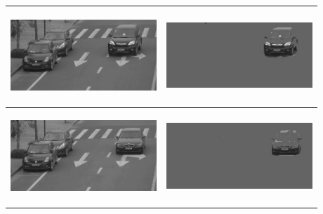 \documentclass[a4paper]{article}
\begin{document}
\begin{itemize}[label={}]
\begin{table}[h!]
\begin{tabular}{|>{\centering\arraybackslash}m{6cm}|>{\centering\arraybackslash}m{6cm}|}
        \includegraphics[width=5.5cm,height=3.5cm]{images/result/frame/frame300.jpg} & \includegraphics[width=5.5cm,height=3.5cm]{images/result/answer/frame300.jpg} \\ \hline
        \includegraphics[width=5.5cm,height=3.5cm]{images/result/frame/frame492.jpg} & \includegraphics[width=5.5cm,height=3.5cm]{images/result/answer/frame492.jpg} \\ \hline
        \end{tabular}
        \label{table:answer}
    \end{table}
     

\end{itemize}
\end{document}
